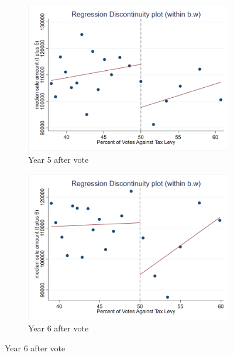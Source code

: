 \begin{figure}[ht]
    \centering
    \begin{minipage}[b]{0.48\textwidth}
        \centering
        \begin{subfigure}[b]{\textwidth}
            \centering
            \includegraphics[width=\textwidth,keepaspectratio]{images/rd_plot_median_sale_amount_t_plus_5_tri_mserd_1_2_within.png}
            \caption{Year 5 after vote}
            \label{fig:hp_year5_after}
        \end{subfigure}
    \end{minipage}
    \hfill
    \begin{minipage}[b]{0.48\textwidth}
        \centering
        \begin{subfigure}[b]{\textwidth}
            \centering
            \includegraphics[width=\textwidth,keepaspectratio]{images/rd_plot_median_sale_amount_t_plus_6_tri_mserd_1_2_within.png}
            \caption{Year 6 after vote}
            \label{fig:hp_year6_after}
        \end{subfigure}
    \end{minipage}    


\end{figure}
